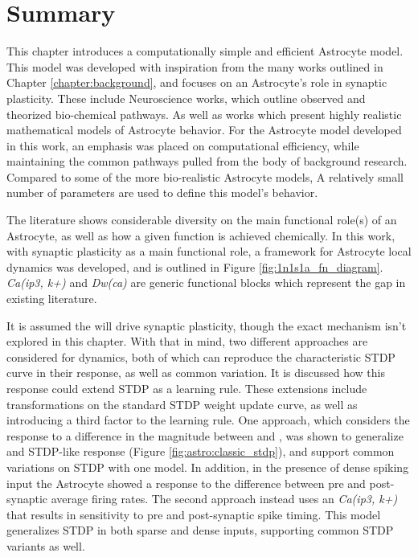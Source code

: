 
\section{Summary}

This chapter introduces a computationally simple and efficient Astrocyte
model. This model was developed with inspiration from the many works outlined in
Chapter \ref{chapter:background}, and focuses on an Astrocyte's role in synaptic
plasticity. These include Neuroscience works, which outline observed and
theorized bio-chemical pathways. As well as works which present highly realistic
mathematical models of Astrocyte behavior. For the Astrocyte model developed in
this work, an emphasis was placed on computational efficiency, while maintaining
the common pathways pulled from the body of background research. Compared to
some of the more bio-realistic Astrocyte models, A relatively small number of
parameters are used to define this model's behavior.

The literature shows considerable diversity on the main functional role(s) of an
Astrocyte, as well as how a given function is achieved chemically. In this work,
with synaptic plasticity as a main functional role, a framework for Astrocyte
local dynamics was developed, and is outlined in Figure
\ref{fig:1n1s1a_fn_diagram}. \emph{Ca(ip3, k+)} and \emph{Dw(ca)} are generic
functional blocks which represent the gap in existing literature.

It is assumed the \ca will drive synaptic plasticity, though the exact mechanism
isn't explored in this chapter. With that in mind, two different approaches are
considered for \ca dynamics, both of which can reproduce the characteristic
STDP curve in their \ca response, as well as common variation. It is discussed
how this \ca response could extend STDP as a learning rule. These
extensions include transformations on the standard STDP weight update curve, as
well as introducing a third factor to the learning rule. One approach, which
considers the \ca response to a difference in the magnitude between \ipt and
\kp, was shown to generalize and STDP-like response (Figure
\ref{fig:astro:classic_stdp}), and support common variations on
STDP with one model. In addition, in the presence of dense spiking input the
Astrocyte showed a response to the difference between pre and post-synaptic
average firing rates. The second approach instead uses an \emph{Ca(ip3, k+)} that
results in sensitivity to pre and post-synaptic spike timing. This model
generalizes STDP in both sparse and dense inputs, supporting common STDP
variants as well.

